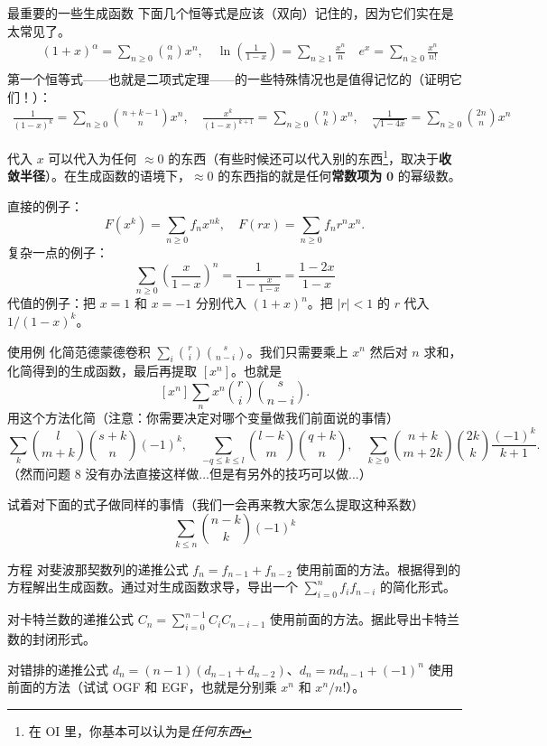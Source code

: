 \begin{frame}{最重要的一些生成函数}
    下面几个恒等式是应该（双向）记住的，因为它们实在是太常见了。
    $$
    \begin{aligned}
    &(1+x)^{\alpha}=\sum_{n\ge 0}\binom{\alpha}{n}x^n,\quad \ln\left(\frac{1}{1-x}\right)=\sum_{n\ge 1}\frac{x^n}{n}\quad e^x=\sum_{n\ge 0}\frac{x^n}{n!}\\
    \end{aligned}
    $$
    第一个恒等式——也就是二项式定理——的一些特殊情况也是值得记忆的（证明它们！）：
    $$
    \begin{aligned}
    \frac{1}{(1-x)^k}=\sum_{n\ge 0}\binom{n+k-1}{n}x^n,\quad\frac{x^k}{(1-x)^{k+1}}=\sum_{n\ge 0}\binom{n}{k}x^n,\quad \frac{1}{\sqrt{1-4x}}=\sum_{n\ge 0}\binom{2n}{n}x^n
    \end{aligned}
    $$
\end{frame}
\begin{frame}{代入}
    $x$ 可以代入为任何 $\approx 0$ 的东西（有些时候还可以代入别的东西\footnote{在 OI 里，你基本可以认为是\textit{任何东西}}，取决于\textbf{收敛半径}）。在生成函数的语境下，$\approx 0$ 的东西指的就是任何\textbf{常数项为} $\mathbf 0$ 的幂级数。

    直接的例子：
    $$
    F(x^k)=\sum_{n\ge 0}f_nx^{nk},\quad F(rx)=\sum_{n\ge 0}f_nr^nx^n.
    $$
    复杂一点的例子：
    $$
    \sum_{n\ge 0}\left(\frac{x}{1-x}\right)^n=\frac{1}{1-\frac{x}{1-x}}=\frac{1-2x}{1-x}
    $$
    代值的例子：把 $x=1$ 和 $x=-1$ 分别代入 $(1+x)^n$。把 $|r|<1$ 的 $r$ 代入 $1/(1-x)^k$。 
\end{frame}
\begin{frame}{使用例}
    化简范德蒙德卷积 $\sum_i\binom{r}{i}\binom{s}{n-i}$。我们只需要乘上 $x^n$ 然后对 $n$ 求和，化简得到的生成函数，最后再提取 $[x^n]$。也就是
    $$
    [x^n]\sum_n x^n\binom{r}{i}\binom{s}{n-i}.
    $$
    用这个方法化简（注意：你需要决定对哪个变量做我们前面说的事情）
    $$
    \sum_{k}\binom{l}{m+k}\binom{s+k}{n}(-1)^k,\quad \sum_{-q\le k\le l}\binom{l-k}{m}\binom{q+k}{n},\quad     \sum_{k\ge 0}\binom{n+k}{m+2k}\binom{2k}{k}\frac{(-1)^k}{k+1}.
    $$
    （然而问题 8 没有办法直接这样做...但是有另外的技巧可以做...）
    
    试着对下面的式子做同样的事情（我们一会再来教大家怎么提取这种系数）
    $$
    \sum_{k\le n}\binom{n-k}{k}(-1)^k
    $$
\end{frame}
\begin{frame}{方程}
    对斐波那契数列的递推公式 $f_n=f_{n-1}+f_{n-2}$ 使用前面的方法。根据得到的方程解出生成函数。通过对生成函数求导，导出一个 $\sum_{i=0}^nf_if_{n-i}$ 的简化形式。
    
    对卡特兰数的递推公式 $C_n=\sum_{i=0}^{n-1}C_iC_{n-i-1}$ 使用前面的方法。据此导出卡特兰数的封闭形式。

    对错排的递推公式 $d_n=(n-1)(d_{n-1}+d_{n-2})$、$d_n=nd_{n-1}+(-1)^n$ 使用前面的方法（试试 OGF 和 EGF，也就是分别乘 $x^n$ 和 $x^n/n!$）。
\end{frame}

